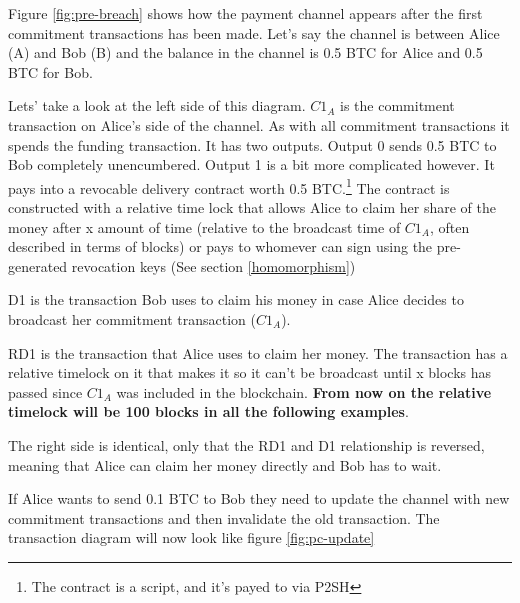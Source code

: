 Figure \ref{fig:pre-breach} shows how the payment channel appears after the first commitment transactions has been made. Let's say the channel is between Alice (A) and Bob (B) and the balance in the channel is 0.5 BTC for Alice and 0.5 BTC for Bob. 

Lets' take a look at the left side of this diagram. \textbf{$C1_{A}$} is the commitment transaction on Alice's side of the channel. As with all commitment transactions it spends the funding transaction. It has two outputs. Output 0 sends 0.5 BTC to Bob completely unencumbered. Output 1 is a bit more complicated however. It pays into a revocable delivery contract worth 0.5 BTC.\footnote{The contract is a script, and it's payed to via P2SH} The contract is constructed with a relative time lock that allows Alice to claim her share of the money after x amount of time (relative to the broadcast time of $C1_{A}$, often described in terms of blocks) or pays to whomever can sign using the pre-generated revocation keys (See section \ref{homomorphism})

D1 is the transaction Bob uses to claim his money in case Alice decides to broadcast her commitment transaction ($C1_{A}$).

RD1 is the transaction that Alice uses to claim her money. The transaction has a relative timelock on it that makes it so it can't be broadcast until x blocks has passed since $C1_{A}$ was included in the blockchain. \textbf{From now on the relative timelock will be 100 blocks in all the following examples}.

The right side is identical, only that the RD1 and D1 relationship is reversed, meaning that Alice can claim her money directly and Bob has to wait. 

If Alice wants to send 0.1 BTC to Bob they need to update the channel with new commitment transactions and then invalidate the old transaction. The transaction diagram will now look like figure \ref{fig:pc-update}

